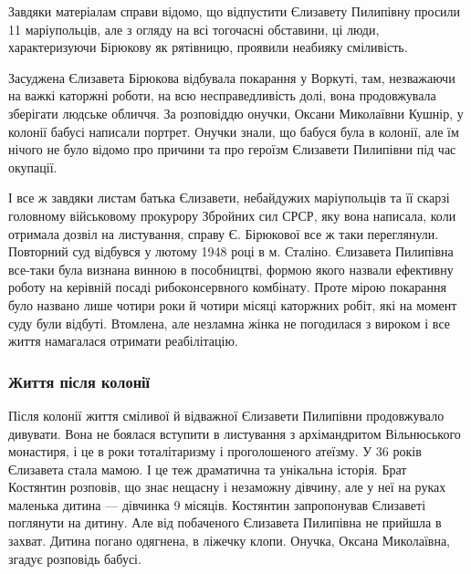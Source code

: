 Завдяки матеріалам справи відомо, що відпустити Єлизавету Пилипівну просили 11
маріупольців, але з огляду на всі тогочасні обставини, ці люди, характеризуючи
Бірюкову як рятівницю, проявили неабияку сміливість.


Засуджена Єлизавета Бірюкова відбувала покарання у Воркуті, там, незважаючи на
важкі каторжні роботи, на всю несправедливість долі, вона продовжувала
зберігати людське обличчя. За розповіддю онучки, Оксани Миколаївни Кушнір, у
колонії бабусі написали портрет. Онучки знали, що бабуся була в колонії, але їм
нічого не було відомо про причини та про героїзм Єлизавети Пилипівни під час
окупації.

І все ж завдяки листам батька Єлизавети, небайдужих маріупольців та її скарзі
головному військовому прокурору Збройних сил СРСР, яку вона написала, коли
отримала дозвіл на листування, справу Є. Бірюкової все ж таки переглянули.
Повторний суд відбувся у лютому 1948 році в м. Сталіно. Єлизавета Пилипівна
все-таки була визнана винною в пособництві, формою якого назвали ефективну
роботу на керівній посаді рибоконсервного комбінату. Проте мірою покарання було
названо лише чотири роки й чотири місяці каторжних робіт, які на момент суду
були відбуті. Втомлена, але незламна жінка не погодилася з вироком і все життя
намагалася отримати реабілітацію.

\subsubsection{Життя після колонії}


Після колонії життя сміливої й відважної Єлизавети Пилипівни продовжувало
дивувати. Вона не боялася вступити в листування з архімандритом Вільнюського
монастиря, і це в роки тоталітаризму і проголошеного атеїзму. У 36 років
Єлизавета стала мамою. І це теж драматична та унікальна історія. Брат Костянтин
розповів, що знає нещасну і незаможну дівчину, але у неї на руках маленька
дитина — дівчинка 9 місяців. Костянтин запропонував Єлизаветі поглянути на
дитину. Але від побаченого Єлизавета Пилипівна не прийшла в захват. Дитина
погано одягнена, в ліжечку клопи. Онучка, Оксана Миколаївна, згадує розповідь
бабусі.

